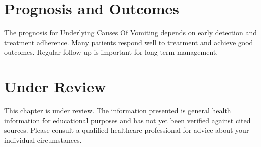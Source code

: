 \section*{Prognosis and Outcomes}
The prognosis for Underlying Causes Of Vomiting depends on early detection and treatment adherence. Many patients respond well to treatment and achieve good outcomes. Regular follow-up is important for long-term management.
\section*{Under Review}
This chapter is under review. The information presented is general health information for educational purposes and has not yet been verified against cited sources. Please consult a qualified healthcare professional for advice about your individual circumstances.


\clearpage
